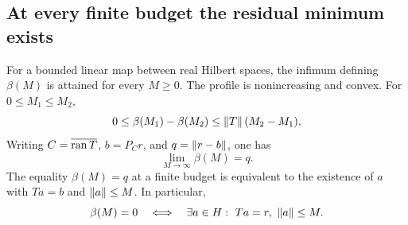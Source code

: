 \subsection{At every finite budget the residual minimum exists}
\begin{KStheorem}\label{KS:WR03}
For a bounded linear map between real Hilbert spaces, the infimum defining $\beta(M)$ is attained for every $M\ge0$. The profile is nonincreasing and convex. For $0\le M_1\le M_2$,
\[
 0\le\beta(M_1)-\beta(M_2)\le\left\lVert T\right\rVert(M_2-M_1).
\]
Writing $C=\overline{\operatorname{ran} T}$, $b=P_Cr$, and $q=\left\lVert r-b\right\rVert$, one has
\[
 \lim_{M\to\infty}\beta(M)=q.
\]
The equality $\beta(M)=q$ at a finite budget is equivalent to the existence of $a$ with $Ta=b$ and $\left\lVert a\right\rVert\le M$. In particular,
\[
 \beta(M)=0\quad\Longleftrightarrow\quad
 \exists a\in H:\ Ta=r,\ \left\lVert a\right\rVert\le M.
\]
\end{KStheorem}
